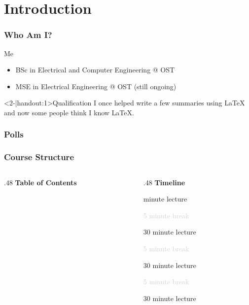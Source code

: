 \section{Introduction}
\begin{frame}
    \frametitle{Who Am I?}
    \begin{block}{\blockstrut Me}
        \begin{itemize}
            \item BSc in Electrical and Computer Engineering @ OST
            \item MSE in Electrical Engineering @ OST (still ongoing)
        \end{itemize}
    \end{block}
    \begin{block}<2-|handout:1>{\blockstrut Qualification}
        I once helped write a few summaries using \LaTeX{} and now some people think I know \LaTeX{}.        
    \end{block}
\end{frame}
\begin{frame}
    \frametitle{Polls}
    \centering
\end{frame}
\begin{frame}
    \frametitle{Course Structure}
    \begin{columns}[t]
        \begin{column}{.48\textwidth}
            {\Large\textbf{Table of Contents}}

            \medskip
            \tableofcontents
        \end{column}
        \begin{column}{.48\textwidth}
            {\Large\textbf{Timeline}}

             minute lecture

            \textcolor{lightgray}{5 minute break}
            
            30 minute lecture

            \textcolor{lightgray}{5 minute break}
            
            30 minute lecture

            \textcolor{lightgray}{5 minute break}
            
            30 minute lecture
        \end{column}
    \end{columns}
\end{frame}